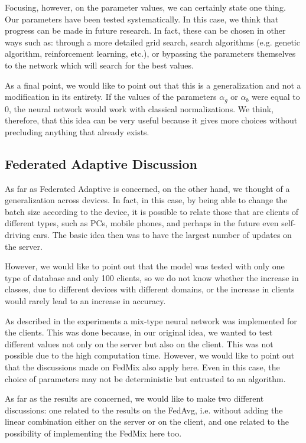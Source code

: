 \documentclass[conference]{IEEEtran}
\begin{document}
Focusing, however, on the parameter values, we can certainly state one thing. Our parameters have been tested systematically. In this case, we think that progress can be made in future research. In fact, these can be chosen in other ways such as: through a more detailed grid search, search algorithms (e.g. genetic algorithm, reinforcement learning, etc.), or bypassing the parameters themselves to the network which will search for the best values.

As a final point, we would like to point out that this is a generalization and not a modification in its entirety. If the values of the parameters $\alpha_g$ or $\alpha_b$ were equal to 0, the neural network would work with classical normalizations. We think, therefore, that this idea can be very useful because it gives more choices without precluding anything that already exists.

\subsection{Federated Adaptive Discussion}
As far as Federated Adaptive is concerned, on the other hand, we thought of a generalization across devices. In fact, in this case, by being able to change the batch size according to the device, it is possible to relate those that are clients of different types, such as PCs, mobile phones, and perhaps in the future even self-driving cars. The basic idea then was to have the largest number of updates on the server. 

However, we would like to point out that the model was tested with only one type of database and only 100 clients, so we do not know whether the increase in classes, due to different devices with different domains, or the increase in clients would rarely lead to an increase in accuracy.

As described in the experiments a mix-type neural network was implemented for the clients. This was done because, in our original idea, we wanted to test different values not only on the server but also on the client. This was not possible due to the high computation time. However, we would like to point out that the discussions made on FedMix also apply here. Even in this case, the choice of parameters may not be deterministic but entrusted to an algorithm.

As far as the results are concerned, we would like to make two different discussions: one related to the results on the FedAvg, i.e. without adding the linear combination either on the server or on the client, and one related to the possibility of implementing the FedMix here too.
\end{document}
